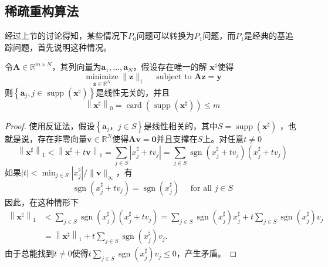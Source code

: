 \subsection{稀疏重构算法}
经过上节的讨论得知，某些情况下$P_0$问题可以转换为$P_1$问题，而$P_1$是经典的基追踪问题，首先说明这种情况。
\begin{theorem}
    令$\mathbf{A} \in \mathbb{R}^{m \times N}$，其列向量为$\mathbf{a}_1,\ldots,\mathbf{a}_N$，假设存在唯一的解
    $\mathbf{x}^{\sharp}$使得
    \begin{equation}
        \underset{\mathbf{z} \in \mathbb{R}^N}{\operatorname{minimize}}\|\mathbf{z}\|_1 \quad \text { subject to } \mathbf{A z}=\mathbf{y}
    \end{equation}
    则$\left\{\mathbf{a}_j,j \in \operatorname{supp}\left(\mathbf{x}^{\sharp}\right)\right\}$是线性无关的，并且
    \begin{equation}
        \left\|\mathbf{x}^{\sharp}\right\|_0=\operatorname{card}\left(\operatorname{supp}\left(\mathbf{x}^{\sharp}\right)\right) \leq m
    \end{equation}
\end{theorem}
\begin{proof}
    使用反证法，假设$\left\{\mathbf{a}_j，j \in S\right\}$是线性相关的，其中$S=\operatorname{supp}\left(\mathbf{x}^{\sharp}\right)$
    ，也就是说，存在非零向量$\mathbf{v} \in \mathbb{R}^N$使得$\mathbf{A v}=\mathbf{0}$并且支撑在$S$上。对任意$t \neq 0$
    \begin{equation}
        \left\|\mathbf{x}^{\sharp}\right\|_1<\left\|\mathbf{x}^{\sharp}+t \mathbf{v}\right\|_1=\sum_{j \in S}\left|x_j^{\sharp}+t v_j\right|=\sum_{j \in S} \operatorname{sgn}\left(x_j^{\sharp}+t v_j\right)\left(x_j^{\sharp}+t v_j\right)
    \end{equation}
    如果$|t|<\min _{j \in S}\left|x_j^{\sharp}\right| /\|\mathbf{v}\|_{\infty}$，有
    \begin{equation}
        \operatorname{sgn}\left(x_j^{\sharp}+t v_j\right)=\operatorname{sgn}\left(x_j^{\sharp}\right) \quad \text { for all } j \in S
    \end{equation}
    因此，在这种情形下
    \begin{equation}
        \begin{aligned}
        \left\|\mathbf{x}^{\sharp}\right\|_1 & <\sum_{j \in S} \operatorname{sgn}\left(x_j^{\sharp}\right)\left(x_j^{\sharp}+t v_j\right)=\sum_{j \in S} \operatorname{sgn}\left(x_j^{\sharp}\right) x_j^{\sharp}+t \sum_{j \in S} \operatorname{sgn}\left(x_j^{\sharp}\right) v_j \\
        & =\left\|\mathbf{x}^{\sharp}\right\|_1+t \sum_{j \in S} \operatorname{sgn}\left(x_j^{\sharp}\right) v_j .
        \end{aligned}
    \end{equation}
    由于总能找到$t \neq 0$使得$t \sum_{j \in S} \operatorname{sgn}\left(x_j^{\sharp}\right) v_j \leq 0$，产生矛盾。
\end{proof}
